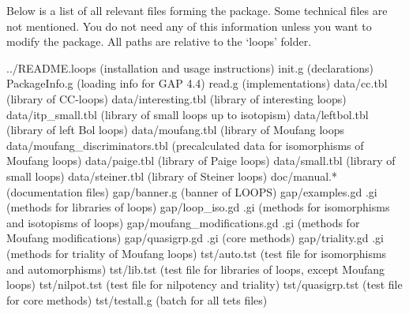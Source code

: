 
Below is a list of all relevant files forming the {\LOOPS} package. Some
technical files are not mentioned. You do not need any of this information
unless you want to modify the package. All paths are relative to the
`loops' folder.

\begintt
../README.loops (installation and usage instructions)
init.g (declarations)
PackageInfo.g (loading info for GAP 4.4)
read.g (implementations)
data/cc.tbl (library of CC-loops)
data/interesting.tbl (library of interesting loops)
data/itp_small.tbl (library of small loops up to isotopism)
data/leftbol.tbl (library of left Bol loops)
data/moufang.tbl (library of Moufang loops
data/moufang_discriminators.tbl (precalculated data for isomorphisms of Moufang loops)
data/paige.tbl (library of Paige loops)
data/small.tbl (library of small loops)
data/steiner.tbl (library of Steiner loops)
doc/manual.* (documentation files)
gap/banner.g (banner of LOOPS)
gap/examples.gd .gi (methods for libraries of loops)
gap/loop_iso.gd .gi (methods for isomorphisms and isotopisms of loops)
gap/moufang_modifications.gd .gi (methods for Moufang modifications)
gap/quasigrp.gd .gi (core methods)
gap/triality.gd .gi (methods for triality of Moufang loops)
tst/auto.tst (test file for isomorphisms and automorphisms)
tst/lib.tst (test file for libraries of loops, except Moufang loops)
tst/nilpot.tst (test file for nilpotency and triality)
tst/quasigrp.tst (test file for core methods)
tst/testall.g (batch for all tets files)
\endtt

